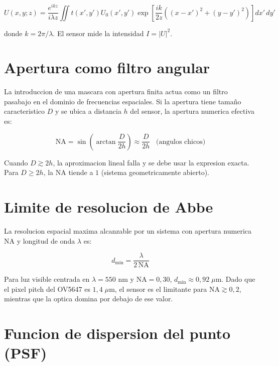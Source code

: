 \documentclass[11pt,a4paper,oneside]{report}
\begin{document}
\begin{equation}
U(x,y;z) = \frac{e^{i k z}}{i \lambda z} \iint t(x',y') U_0(x',y')
\exp\!\left[\frac{i k}{2 z}\left((x-x')^2 + (y-y')^2\right)\right] dx'\,dy'
\label{eq:fresnel}
\end{equation}

donde $k = 2\pi/\lambda$. El sensor mide la intensidad $I = |U|^2$.

\section{Apertura como filtro angular}

La introduccion de una mascara con apertura finita actua como un
filtro pasabajo en el dominio de frecuencias espaciales. Si la apertura
tiene tamaño caracteristico $D$ y se ubica a distancia $h$ del sensor,
la apertura numerica efectiva es:

\begin{equation}
\boxed{\;\mathrm{NA} = \sin\!\left(\arctan\!\frac{D}{2h}\right) \approx \frac{D}{2h}\;\;\;\text{(angulos chicos)}\;}
\label{eq:na}
\end{equation}

Cuando $D \gtrsim 2h$, la aproximacion lineal falla y se debe usar la
expresion exacta. Para $D \geq 2h$, la NA tiende a $1$ (sistema
geometricamente abierto).

\section{Limite de resolucion de Abbe}

La resolucion espacial maxima alcanzable por un sistema con apertura
numerica $\mathrm{NA}$ y longitud de onda $\lambda$ es:

\begin{equation}
d_{\min} = \frac{\lambda}{2\,\mathrm{NA}}
\label{eq:abbe}
\end{equation}

Para luz visible centrada en $\lambda = 550$ nm y $\mathrm{NA} = 0{,}30$,
$d_{\min} \approx 0{,}92\;\mu$m. Dado que el pixel pitch del OV5647 es
$1{,}4\;\mu$m, el sensor es el limitante para $\mathrm{NA} \gtrsim 0{,}2$,
mientras que la optica domina por debajo de ese valor.

\section{Funcion de dispersion del punto (PSF)}
\end{document}
